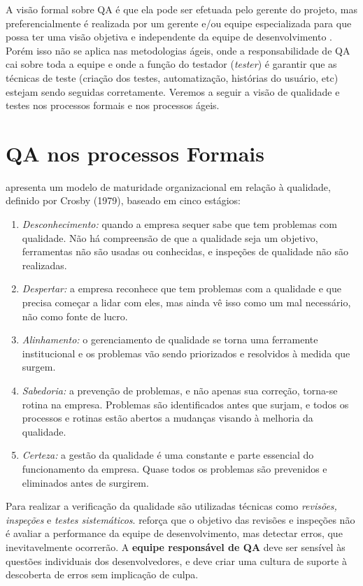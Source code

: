 \documentclass[
	12pt,				%
	openright,			%
	oneside,			%
	a4paper,			%
	english,			%
	brazil,				%
	]{abntex2}
\begin{document}
A visão formal sobre QA é que ela pode ser efetuada pelo gerente do projeto, mas preferencialmente é realizada por um gerente e/ou equipe especializada para que possa ter uma visão objetiva e independente da equipe de desenvolvimento \cite{SOMMERVILLE2011}. Porém isso não se aplica nas metodologias ágeis, onde a responsabilidade de QA cai sobre toda a equipe e onde a função do testador (\emph{tester}) é garantir que as técnicas de teste (criação dos testes, automatização, histórias do usuário, etc) estejam sendo seguidas corretamente. Veremos a seguir a visão de qualidade e testes nos processos formais e nos processos ágeis. %

\section{QA nos processos Formais}

 apresenta um modelo de maturidade organizacional em relação à qualidade, definido por Crosby (1979), baseado em cinco estágios:
\begin{enumerate}
    \item \emph{Desconhecimento:} quando a empresa sequer sabe que tem problemas com qualidade. Não há compreensão de que a qualidade seja um objetivo, ferramentas não são usadas ou conhecidas, e inspeções de qualidade não são realizadas.
    \item \emph{Despertar:} a empresa reconhece que tem problemas com a qualidade e que precisa começar a lidar com eles, mas ainda vê isso como um mal necessário, não como fonte de lucro.
    \item \emph{Alinhamento:} o gerenciamento de qualidade se torna uma ferramente institucional e os problemas vão sendo priorizados e resolvidos à medida que surgem.
    \item \emph{Sabedoria:} a prevenção de problemas, e não apenas sua correção, torna-se rotina na empresa. Problemas são identificados antes que surjam, e todos os processos e rotinas estão abertos a mudanças visando à melhoria da qualidade.
    \item \emph{Certeza:} a gestão da qualidade é uma constante e parte essencial do funcionamento da empresa. Quase todos os problemas são prevenidos e eliminados antes de surgirem.
\end{enumerate}

Para realizar a verificação da qualidade são utilizadas técnicas como \emph{revisões, inspeções} e \emph{testes sistemáticos}.  reforça que o objetivo das revisões e inspeções não é avaliar a performance da equipe de desenvolvimento, mas detectar erros, que inevitavelmente ocorrerão. A \textbf{equipe responsável de QA} deve ser sensível às questões individuais dos desenvolvedores, e deve criar uma cultura de suporte à descoberta de erros sem implicação de culpa.
\end{document}
